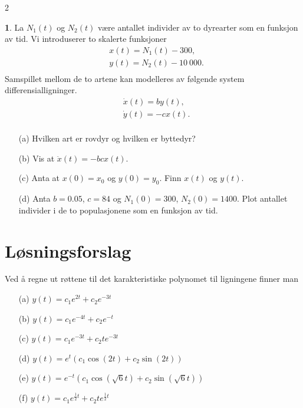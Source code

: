 \documentclass{article}
\theoremstyle{definition}
\newtheorem{oppg}{}
\newenvironment{customoppg}[1]
    {\renewcommand\theinnercustomoppg{#1}\innercustomoppg}
    {\endinnercustomoppg}
\theoremstyle{remark}
\begin{document}
\begin{multicols*}{2}
\begin{oppg}  
  La $N_1(t)$ og $N_2(t)$ være antallet individer av to dyrearter som en funksjon av tid. Vi introduserer to skalerte funksjoner
  \begin{equation*}
    \begin{split}
      & x(t) = N_1(t) - 300, \\
      & y(t) = N_2(t) - 10\ 000. \\
    \end{split}
  \end{equation*}
  Samspillet mellom de to artene kan modelleres av følgende system differensialligninger.
    \begin{equation*}
      \begin{split}
        & \dot{x}(t) = by(t), \\
        & \dot{y}(t) = -cx(t). \\
      \end{split}
    \end{equation*}
  \begin{itemize}
    \item[(a)] Hvilken art er rovdyr og hvilken er byttedyr?
    \item[(b)] Vis at $\ddot{x}(t) = -bc x(t)$.
    \item[(c)] Anta at $x(0) = x_0$ og $y(0) = y_0$. Finn $x(t)$ og $y(t)$.
    \item[(d)] Anta $b=0.05$, $c=84$ og $N_1(0) = 300$, $N_2(0) = 1400$. Plot antallet individer i de to populasjonene som en funksjon av tid.
  \end{itemize}
\end{oppg}



\newpage
\section*{Løsningsforslag}

\begin{customoppg}{1}
  Ved å regne ut røttene til det karakteristiske polynomet til ligningene finner man
  \begin{itemize}
    \item[(a)] $y(t) = c_1 e^{2t} + c_2 e^{-3t}$
    \item[(b)] $y(t) = c_1 e^{-4t} + c_2 e^{-t}$
    \item[(c)] $y(t) = c_1 e^{-3t} + c_2 te^{-3t}$
    \item[(d)] $y(t) = e^t (c_1 \cos(2t) + c_2 \sin(2t))$
    \item[(e)] $y(t) = e^{-t} (c_1 \cos(\sqrt{6}t) + c_2 \sin(\sqrt{6}t))$
    \item[(f)] $y(t) = c_1 e^{\frac{1}{2}t} + c_2 t e^{\frac{1}{2}t}$
  \end{itemize}
\end{customoppg}


\end{multicols*}
\end{document}
